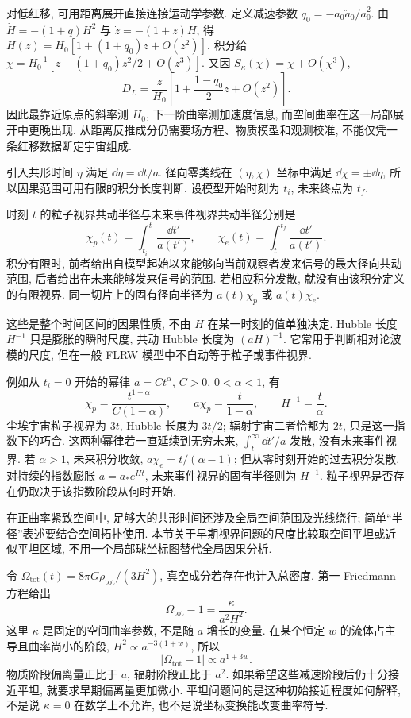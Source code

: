 对低红移, 可用距离展开直接连接运动学参数. 定义减速参数 $q_0=-a_0\ddot a_0/\dot a_0^2$. 由 $\dot H=-(1+q)H^2$ 与 $\dot z=-(1+z)H$, 得 $H(z)=H_0[1+(1+q_0)z+O(z^2)]$. 积分给 $\chi=H_0^{-1}[z-(1+q_0)z^2/2+O(z^3)]$. 又因 $S_\kappa(\chi)=\chi+O(\chi^3)$,
\[
 D_L=\frac z{H_0}\left[1+\frac{1-q_0}{2}z+O(z^2)\right].
\]
因此最靠近原点的斜率测 $H_0$, 下一阶曲率测加速度信息, 而空间曲率在这一局部展开中更晚出现. 从距离反推成分仍需要场方程、物质模型和观测校准, 不能仅凭一条红移数据断定宇宙组成.


引入共形时间 $\eta$ 满足 $\dd\eta=\dd t/a$. 径向零类线在 $(\eta,\chi)$ 坐标中满足 $\dd\chi=\pm\dd\eta$, 所以因果范围可用有限的积分长度判断. 设模型开始时刻为 $t_i$, 未来终点为 $t_f$.

\begin{definition}
时刻 $t$ 的粒子视界共动半径与未来事件视界共动半径分别是
\[
 \chi_p(t)=\int_{t_i}^t\frac{\dd t'}{a(t')},\qquad
 \chi_e(t)=\int_t^{t_f}\frac{\dd t'}{a(t')}.
\]
积分有限时, 前者给出自模型起始以来能够向当前观察者发来信号的最大径向共动范围, 后者给出在未来能够发来信号的范围. 若相应积分发散, 就没有由该积分定义的有限视界. 同一切片上的固有径向半径为 $a(t)\chi_p$ 或 $a(t)\chi_e$.
\end{definition}

这些是整个时间区间的因果性质, 不由 $H$ 在某一时刻的值单独决定. Hubble 长度 $H^{-1}$ 只是膨胀的瞬时尺度, 共动 Hubble 长度为 $(aH)^{-1}$. 它常用于判断相对论波模的尺度, 但在一般 FLRW 模型中不自动等于粒子或事件视界.

例如从 $t_i=0$ 开始的幂律 $a=Ct^\alpha$, $C>0$, $0<\alpha<1$, 有
\[
 \chi_p=\frac{t^{1-\alpha}}{C(1-\alpha)},\qquad
 a\chi_p=\frac{t}{1-\alpha},\qquad H^{-1}=\frac t\alpha.
\]
尘埃宇宙粒子视界为 $3t$, Hubble 长度为 $3t/2$; 辐射宇宙二者恰都为 $2t$, 只是这一指数下的巧合. 这两种幂律若一直延续到无穷未来, $\int_t^\infty\dd t'/a$ 发散, 没有未来事件视界. 若 $\alpha>1$, 未来积分收敛, $a\chi_e=t/(\alpha-1)$; 但从零时刻开始的过去积分发散. 对持续的指数膨胀 $a=a_*e^{Ht}$, 未来事件视界的固有半径则为 $H^{-1}$. 粒子视界是否存在仍取决于该指数阶段从何时开始.

在正曲率紧致空间中, 足够大的共形时间还涉及全局空间范围及光线绕行; 简单“半径”表述要结合空间拓扑使用. 本节关于早期视界问题的尺度比较取空间平坦或近似平坦区域, 不用一个局部球坐标图替代全局因果分析.


令 $\Omega_{\mathrm{tot}}(t)=8\pi G\rho_{\mathrm{tot}}/(3H^2)$, 真空成分若存在也计入总密度. 第一 Friedmann 方程给出
\begin{equation}\label{gr6-flatness}
 \Omega_{\mathrm{tot}}-1=\frac\kappa{a^2H^2}.
\end{equation}
这里 $\kappa$ 是固定的空间曲率参数, 不是随 $a$ 增长的变量. 在某个恒定 $w$ 的流体占主导且曲率尚小的阶段, $H^2\propto a^{-3(1+w)}$, 所以
\[
 |\Omega_{\mathrm{tot}}-1|\propto a^{1+3w}.
\]
物质阶段偏离量正比于 $a$, 辐射阶段正比于 $a^2$. 如果希望这些减速阶段后仍十分接近平坦, 就要求早期偏离量更加微小. 平坦问题问的是这种初始接近程度如何解释, 不是说 $\kappa=0$ 在数学上不允许, 也不是说坐标变换能改变曲率符号.

